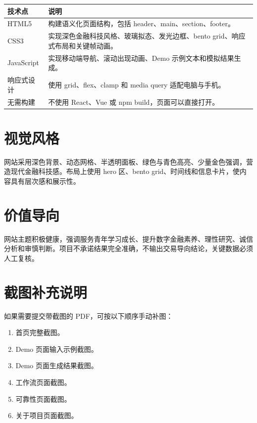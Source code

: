 \documentclass[UTF8,a4paper,12pt]{ctexart}
\begin{document}
\begin{longtable}{|p{4cm}|p{9cm}|}
\hline
\textbf{技术点} & \textbf{说明} \\
\hline
HTML5 & 构建语义化页面结构，包括 header、main、section、footer。 \\
\hline
CSS3 & 实现深色金融科技风格、玻璃拟态、发光边框、bento grid、响应式布局和关键帧动画。 \\
\hline
JavaScript & 实现移动端导航、滚动出现动画、Demo 示例文本和模拟结果生成。 \\
\hline
响应式设计 & 使用 grid、flex、clamp 和 media query 适配电脑与手机。 \\
\hline
无需构建 & 不使用 React、Vue 或 npm build，页面可以直接打开。 \\
\hline
\end{longtable}

\section{视觉风格}

网站采用深色背景、动态网格、半透明面板、绿色与青色高亮、少量金色强调，营造现代金融科技感。布局上使用 hero 区、bento grid、时间线和信息卡片，使内容具有层次感和展示性。

\section{价值导向}

网站主题积极健康，强调服务青年学习成长、提升数字金融素养、理性研究、诚信分析和审慎判断。项目不承诺结果完全准确，不输出交易导向结论，关键数据必须人工复核。

\section{截图补充说明}

如果需要提交带截图的 PDF，可按以下顺序手动补图：

\begin{enumerate}[leftmargin=2em]
  \item 首页完整截图。
  \item Demo 页面输入示例截图。
  \item Demo 页面生成结果截图。
  \item 工作流页面截图。
  \item 可靠性页面截图。
  \item 关于项目页面截图。
\end{enumerate}
\end{document}
